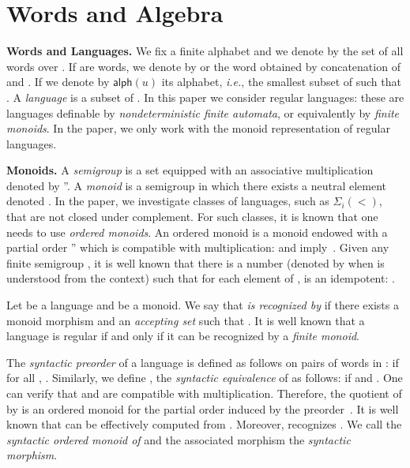 \documentclass[envcountsame]{llncs}
\newcommand{\siwi}{\ensuremath{\Sigma_{i}(<)}\xspace}
\newcommand\content[1]{\ensuremath{\contentmorphism(#1)}}
\newcommand\contentmorphism{\ensuremath{\textsf{alph}}}
\begin{document}
\section{Words and Algebra}
\label{sec:words}
\newcommand\one{\textup{1}}

\medskip
\noindent
{\textbf{Words and Languages.}} We fix a finite alphabet  and we
denote by  the set of all words over . If  are words, we 
denote by  or  the word obtained by concatenation of  and
. If  we denote by \content{u} its alphabet, \emph{i.e.}, the
smallest subset  of  such that . A \emph{language} is a subset of . In
this paper we consider regular languages: these are languages
definable by \emph{nondeterministic finite automata}, or
equivalently by \emph{finite monoids}. In the paper, we only work with
the monoid representation of regular languages.


\medskip
\noindent
{\textbf{Monoids.}} A \emph{semigroup} is a set  equipped with an
associative multiplication denoted by ''. A \emph{monoid} 
is a semigroup in which there exists a neutral element denoted
. In the paper, we investigate classes of languages, such as
\siwi, that are not closed under complement. For such classes, it is
known that one needs to use \emph{ordered monoids}.  An ordered
monoid is a monoid endowed with a partial order '' which is
compatible with multiplication:  and 
imply~.
Given any finite semigroup , it is well known
that there is a number  (denoted by  when  is
understood from the context) such that for each element  of ,
 is an idempotent: . 

Let  be a language and  be a monoid. We say that \emph{ is
  recognized by } if there exists a monoid morphism  and an \emph{accepting set}  such that
. It is well known that a language is regular if and only if it
can be recognized by a \emph{finite monoid}.



\medskip
{} The \emph{syntactic preorder}  of a language  is defined as follows
on pairs of words in :  if for all , . Similarly, we define , the \emph{syntactic
  equivalence} of  as follows:  if  and . One can verify that  and  are compatible with
multiplication. Therefore, the quotient  of  by  is an
ordered monoid for the partial order induced by the preorder~.  It is
well known that  can be effectively computed from . Moreover, 
recognizes . We call  the \emph{syntactic ordered monoid of } and
the associated morphism the \emph{syntactic morphism}.
\end{document}
